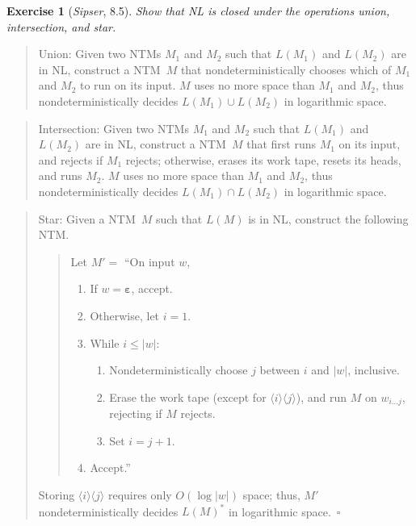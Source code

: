 \documentclass{article}
\theoremstyle{break}			%
\newtheorem{exercise}{Exercise}
\theoremstyle{plain}
\newenvironment{answer}{\begin{quotation}\noindent}{\end{quotation}}
\newcommand{\sipser}{\textit{Sipser}}
\newcommand{\encoding}[1]{\ensuremath{\langle#1\rangle}}
\renewcommand{\qed}{~\ensuremath{\square}}
\newcommand{\NTM}{\textsf{NTM}}
\newcommand{\emptystring}{\ensuremath{\boldsymbol\varepsilon}}
\begin{document}
\begin{exercise}[\sipser, 8.5]
Show that NL is closed under the operations union, intersection, and
star.
\end{exercise}
\begin{answer}
Union: Given two \NTM s $M_1$ and $M_2$ such that $L(M_1)$ and
$L(M_2)$ are in NL, construct a \NTM\ $M$ that nondeterministically
chooses which of $M_1$ and $M_2$ to run on its input.  $M$ uses no
more space than $M_1$ and $M_2$, thus nondeterministically decides
$L(M_1)\cup L(M_2)$ in logarithmic space.
\end{answer}
\begin{answer}
Intersection: Given two \NTM s $M_1$ and $M_2$ such that $L(M_1)$ and
$L(M_2)$ are in NL, construct a \NTM\ $M$ that first runs $M_1$ on its
input, and rejects if $M_1$ rejects; otherwise, erases its work tape,
resets its heads, and runs $M_2$.  $M$ uses no more space than $M_1$
and $M_2$, thus nondeterministically decides $L(M_1)\cap L(M_2)$ in
logarithmic space.
\end{answer}
\begin{answer}
Star: Given a \NTM\ $M$ such that $L(M)$ is in NL, construct the
following \NTM.
\begin{quotation}
\noindent Let $M'=$ ``On input $w$,
\begin{enumerate}
\item If $w=\emptystring$, accept.
\item Otherwise, let $i=1$.
\item While $i\leq |w|$:
\begin{enumerate}
\item Nondeterministically choose $j$ between $i$ and $|w|$, inclusive.
\item Erase the work tape (except for $\encoding i\encoding j$), and
run $M$ on $w_{i\ldots j}$, rejecting if $M$ rejects.
\item Set $i=j+1$.
\end{enumerate}
\item Accept.''
\end{enumerate}
\end{quotation}
Storing $\encoding i\encoding j$ requires only $O(\log |w|)$
space; thus, $M'$ nondeterministically decides $L(M)^*$ in logarithmic
space.\qed
\end{answer}
\end{document}
